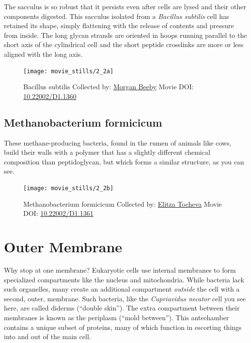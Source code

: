 \documentclass[]{tufte-book}
\begin{document}
The sacculus is so robust that it persists even after cells are lysed
and their other components digested. This sacculus isolated from a
\emph{Bacillus subtilis} cell has retained its shape, simply flattening
with the release of contents and pressure from inside. The long glycan
strands are oriented in hoops running parallel to the short axis of the
cylindrical cell and the short peptide crosslinks are more or less
aligned with the long axis.





\begin{figure}
\texttt{[image: movie\_stills/2\_2a]} \caption[Bacillus subtilis Collected by:
\protect\hyperlink{morgan_beeby}{Morgan Beeby} Movie DOI:
\href{https://doi.org/10.22002/D1.1360}{10.22002/D1.1360}]{Bacillus subtilis Collected by:
\protect\hyperlink{morgan_beeby}{Morgan Beeby} Movie DOI:
\href{https://doi.org/10.22002/D1.1360}{10.22002/D1.1360}}\label{fig:2-2a}
\end{figure}

\hypertarget{Methanobacterium_formicicum}{\subsection{Methanobacterium
formicicum}\label{Methanobacterium_formicicum}}

These methane-producing bacteria, found in the rumen of animals like
cows, build their walls with a polymer that has a slightly different
chemical composition than peptidoglycan, but which forms a similar
structure, as you can see.





\begin{figure}
\texttt{[image: movie\_stills/2\_2b]} \caption[Methanobacterium formicicum Collected by:
\protect\hyperlink{elitza_tocheva}{Elitza Tocheva} Movie DOI:
\href{https://doi.org/10.22002/D1.1361}{10.22002/D1.1361}]{Methanobacterium formicicum Collected by:
\protect\hyperlink{elitza_tocheva}{Elitza Tocheva} Movie DOI:
\href{https://doi.org/10.22002/D1.1361}{10.22002/D1.1361}}\label{fig:2-2b}
\end{figure}

\section{Outer Membrane}\label{outer-membrane}

Why stop at one membrane? Eukaryotic cells use internal membranes to
form specialized compartments like the nucleus and mitochondria. While
bacteria lack such organelles, many create an additional compartment
\emph{outside} the cell with a second, outer, membrane. Such bacteria,
like the \emph{Cupriavidus necator} cell you see here, are called
diderms (``double skin''). The extra compartment between their membranes
is known as the periplasm (``mold between''). This antechamber contains
a unique subset of proteins, many of which function in escorting things
into and out of the main cell.
\end{document}
